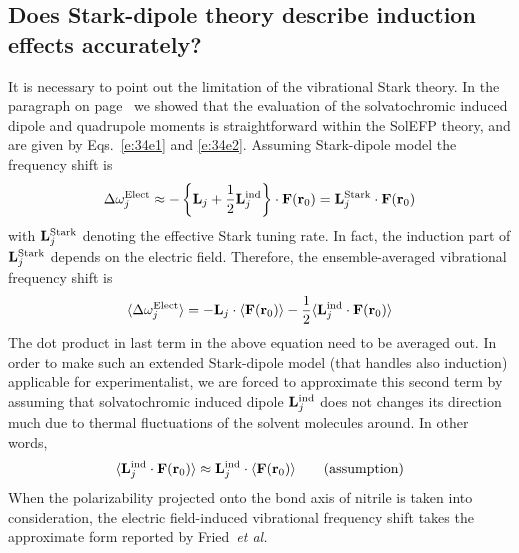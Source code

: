 \documentclass[a4paper,titlepage,twoside,fleqn,12pt]{book}
\begin{document}
\begin{refsection}
\subsection{Does Stark-dipole theory describe induction effects accurately?\label{s:stark-dipole-cn}}

It is necessary to point out the limitation of the
vibrational Stark theory. 
In the paragraph on page~\pageref{p:solindmult} we showed that the
evaluation of the solvatochromic induced dipole and quadrupole moments is
straightforward within the SolEFP theory, and are given by Eqs.~\eqref{e:34e1} and \eqref{e:34e2}.
Assuming Stark\hyp{}dipole model the frequency shift
is
%
\begin{equation} \label{e:dmtp-solmmm-dipole}
 \Delta\omega_j^{\rm Elect} \approx  -
                       \left\{ {\bf L}_j + \frac{1}{2} {\bf L}_j^{\rm ind} \right\} 
                       \cdot {\bf F}({\bf r}_0) = {\bf L}_j^{\rm Stark} \cdot {\bf F}({\bf r}_0)
\end{equation}
%
with ${\bf L}_j^{\rm Stark}$ denoting the effective Stark tuning rate.
In fact, the induction part of ${\bf L}_j^{\rm Stark}$ depends on the electric field.
Therefore, the ensemble\hyp{}averaged vibrational frequency shift
is
%
\begin{equation} 
 \langle \Delta\omega_j^{\rm Elect} \rangle =  -
                        {\bf L}_j  \cdot  \langle  {\bf F}({\bf r}_0) \rangle 
                     - \frac{1}{2} \langle {\bf L}_j^{\rm ind}  \cdot {\bf F}({\bf r}_0) \rangle
\end{equation}
%
The dot product in last term in the above equation need to be averaged out.
In order to make such an extended Stark\hyp{}dipole model (that handles also induction)
applicable for experimentalist, we are forced to approximate this second term
by assuming that solvatochromic induced dipole ${\bf L}_j^{\rm ind}$ does not
changes its direction much due to thermal fluctuations of the solvent molecules around.
In other words,
%
\begin{equation} \label{e:dmtp-solmmm-dipole-assumption} 
\langle {\bf L}_j^{\rm ind}  \cdot {\bf F}({\bf r}_0) \rangle \approx 
{\bf L}_j^{\rm ind} \cdot  \langle  {\bf F}({\bf r}_0) \rangle 
\qquad \text{(assumption)}
\end{equation}
%
When the polarizability projected onto
the bond axis of nitrile is taken into consideration,
the electric field\hyp{}induced vibrational frequency
shift takes the approximate form reported by 
Fried~\emph{et al.} \citep{Fried.Wang.Boxer.Ren.Pande.JPCB.2013}

\end{refsection}
\end{document}
